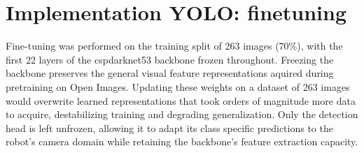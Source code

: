 \section{Implementation YOLO: finetuning}
Fine-tuning was performed on the training split of 263 images (70\%), 
with the first 22 layers of the \gls{cspdarknet53} backbone frozen throughout. 
Freezing the backbone preserves the general visual feature representations 
aquired during pretraining on Open Images. Updating these weights on a 
dataset of 263 images would overwrite learned representations that took 
orders of magnitude more data to acquire, destabilizing training and 
degrading generalization. Only the detection head is left unfrozen, 
allowing it to adapt its class specific predictions to the robot's 
camera domain while retaining the backbone's feature extraction capacity. 

